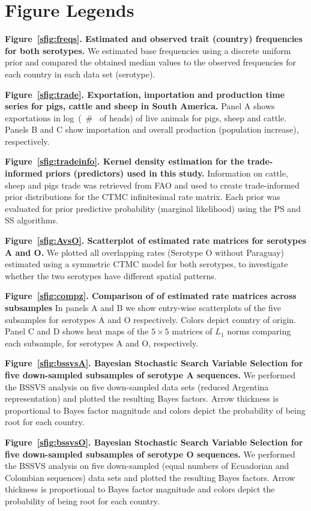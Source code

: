 \documentclass[a4paper,10pt]{article}
\begin{document}
\section*{Figure Legends}
\textbf{Figure~\ref{sfig:freqs}. Estimated and observed trait (country) frequencies for both serotypes.}
We estimated base frequencies using a discrete uniform prior and compared the obtained median values to the observed frequencies for each country in each data set (serotype). 

\textbf{Figure~\ref{sfig:trade}. Exportation, importation and production time series for pigs, cattle and sheep in South America.}
Panel A shows exportations in log~(~\# ~of heads) of live animals for pigs, sheep and cattle.
Panels B and C show importation and overall production (population increase), respectively.

\textbf{Figure~\ref{sfig:tradeinfo}. Kernel density estimation for the trade-informed priors (predictors) used in this study.}
Information on cattle, sheep and pigs trade was retrieved from FAO and used to create trade-informed prior distributions for the CTMC infinitesimal rate matrix.
Each prior was evaluated for prior predictive probability (marginal likelihood) using the PS and SS algorithms. 

\textbf{Figure~\ref{sfig:AvsO}. Scatterplot of estimated rate matrices for serotypes A and O.}
We plotted all overlapping rates (Serotype O without Paraguay) estimated using a symmetric CTMC model for both serotypes, to investigate whether the two serotypes have different spatial patterns.

\textbf{Figure~\ref{sfig:compz}. Comparison of of estimated rate matrices across subsamples}
In panels A and B we show entry-wise scatterplots of the five subsamples for serotypes A and O respectively.
Colors depict country of origin.
Panel C and D shows heat maps of the $5\times5$ matrices of $L_1$ norms comparing each subsample, for serotypes A and O, respectively.

\textbf{Figure~\ref{sfig:bssvsA}. Bayesian Stochastic Search Variable Selection for five down-sampled subsamples of serotype A sequences.}
We performed the BSSVS analysis on five down-sampled data sets (reduced Argentina representation) and plotted the resulting Bayes factors.
Arrow thickness is proportional to Bayes factor magnitude and colors depict the probability of being root for each country.

\textbf{Figure~\ref{sfig:bssvsO}. Bayesian Stochastic Search Variable Selection for five down-sampled subsamples of serotype O sequences.}
We performed the BSSVS analysis on five down-sampled (equal numbers of Ecuadorian and Colombian sequences) data sets and  plotted the resulting Bayes factors.
Arrow thickness is proportional to Bayes factor magnitude and colors depict the probability of being root for each country.
\end{document}
